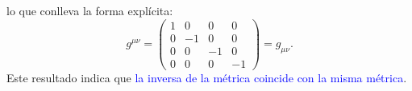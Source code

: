 \begin{solution}

lo que conlleva la forma explícita:
\begin{equation}
g^{\mu \nu }=\left( 
\begin{array}{cccc}
1 & 0 & 0 & 0 \\ 
0 & -1 & 0 & 0 \\ 
0 & 0 & -1 & 0 \\ 
0 & 0 & 0 & -1%
\end{array}
\right) =g_{\mu \nu }  \label{25b}.
\end{equation}
Este resultado indica que \textcolor{blue}{la inversa de la métrica coincide con la misma métrica}.
\end{solution}

